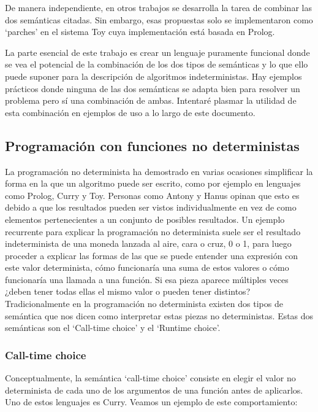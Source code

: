 \documentclass[class=article, crop=false]{standalone}
\begin{document}
De manera independiente, en otros trabajos\cite{riesco2014singular} se desarrolla la tarea de
combinar las dos semánticas citadas. Sin embargo, esas propuestas solo se implementaron como
`parches' en el sistema Toy cuya implementación está basada en Prolog.

La parte esencial de este trabajo es crear un lenguaje puramente funcional donde se vea el
potencial de la combinación de los dos tipos de semánticas y lo que ello puede suponer para
la descripción de algoritmos indeterministas. Hay ejemplos prácticos donde ninguna de las dos
semánticas se adapta bien para resolver un problema pero sí una combinación de ambas.
Intentaré plasmar la utilidad de esta combinación en ejemplos de uso a lo largo de este
documento.

\subsection{Programación con funciones no deterministas}\label{sec:prog_func_ind}
La programación no determinista ha demostrado en varias ocasiones simplificar la forma en la
que un algoritmo puede ser escrito, como por ejemplo en lenguajes como Prolog, Curry y Toy.
Personas como Antony y Hanus opinan que esto es debido a que los resultados pueden ser vistos
individualmente en vez de como elementos pertenecientes a un conjunto de posibles
resultados\cite{antoy2010functional}. Un ejemplo recurrente para explicar la programación no
determinista suele ser el resultado indeterminista de una moneda lanzada al aire, cara o
cruz, 0 o 1, para luego proceder a explicar las formas de las que se puede entender una
expresión con este valor determinista, cómo funcionaría una suma de estos valores o cómo
funcionaría una llamada a una función. Si esa pieza aparece múltiples veces ¿deben tener
todas ellas el mismo valor o pueden tener distintos? Tradicionalmente en la programación no
determinista existen dos tipos de semántica que nos dicen como interpretar estas piezas no
deterministas. Estas dos semánticas son el `Call-time choice' y el `Runtime choice'.

\subsubsection{Call-time choice}
Conceptualmente, la semántica `call-time choice' consiste en elegir el valor no determinista
de cada uno de los argumentos de una función antes de aplicarlos\cite{fischer2011purely}. Uno
de estos lenguajes es Curry. Veamos un ejemplo de este comportamiento:
\end{document}

